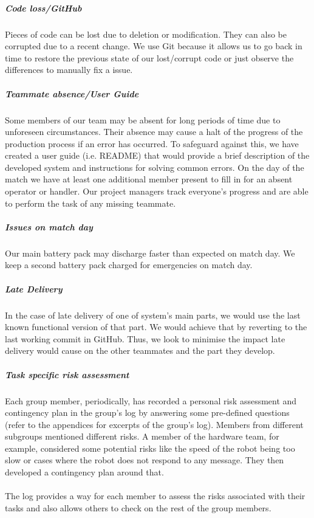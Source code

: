 \subparagraph{Code loss/GitHub}
Pieces of code can be lost due to deletion or modification. They can also be corrupted due to a recent change. We use Git because it allows us to go back in time to restore the previous state of our lost/corrupt code or just observe the differences to manually fix a issue.

\subparagraph{Teammate absence/User Guide}
Some members of our team may be absent for long periods of time due to unforeseen circumstances. Their absence may cause a halt of the progress of the production process if an error has occurred. To safeguard against this, we have created a user guide (i.e. README) that would provide a brief description of the developed system and  instructions for solving common errors. On the day of the match we have at least one additional member present to fill in for an absent operator or handler.  Our project managers track everyone's progress and are able to perform the task of any missing teammate. 

\subparagraph{Issues on match day}
Our main battery pack may discharge faster than expected on match day. We keep a second battery pack charged for emergencies on match day.

\subparagraph{Late Delivery}
In the case of late delivery of one of system's main parts, we would use the last known functional version of that part. We would achieve that by reverting to the last working commit in GitHub. Thus, we look to minimise the impact late delivery would cause on the other teammates and the part they develop.

\subparagraph{Task specific risk assessment}
Each group member, periodically, has recorded a personal risk assessment and contingency plan in the group's log by answering some pre-defined questions (refer to the appendices for excerpts of the group's log). Members from different subgroups mentioned different risks. A member of the hardware team, for example,   considered some potential risks like the speed of the robot being too slow or cases where the robot does not respond to any message. They then developed a contingency plan around that. 
\\ \\ The log provides a way for each member to assess the risks associated with their tasks and also allows others to check on the rest of the group members.

\iffalse
key is hidden in safe place
have 2 code repos we have run - fred and craig's robot
what to do in budget inefficiency?
how to test if pitch is full?
IDEAS
Where should staff meet in the event the building is not accessible?
Who has the authority to close the business in the event of an emergency?
Which staff members are critical and must be on-site or always reachable?
Where are the back-ups and how are they restored?
Who can cover for each critical staff member?
Who are single points of failure and how can those risks be ameliorated?
What systems, vendors, and partners pose risk should they fail?
Who is responsible for communicating with customers, and how?
\fi
